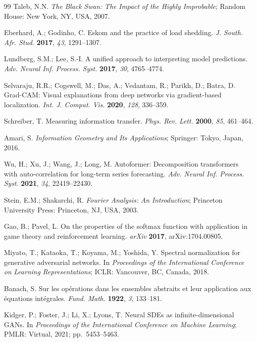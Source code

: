 \documentclass[11pt,a4paper]{article}  %
\theoremstyle{plain}
\theoremstyle{definition}
\theoremstyle{remark}
\begin{document}
\begin{thebibliography}{99}
Taleb, N.N. \textit{The Black Swan: The Impact of the Highly
Improbable}; Random House: New York, NY, USA, 2007.

Eberhard, A.; Godinho, C. Eskom and the practice of load shedding.
\textit{J. South. Afr. Stud.} \textbf{2017}, \textit{43}, 1291--1307.

Lundberg, S.M.; Lee, S.-I. A unified approach to interpreting model
predictions. \textit{Adv. Neural Inf. Process. Syst.} \textbf{2017},
\textit{30}, 4765--4774.

Selvaraju, R.R.; Cogswell, M.; Das, A.; Vedantam, R.; Parikh, D.;
Batra, D. Grad-CAM: Visual explanations from deep networks via
gradient-based localization. \textit{Int. J. Comput. Vis.}
\textbf{2020}, \textit{128}, 336--359.

Schreiber, T. Measuring information transfer. \textit{Phys. Rev. Lett.}
\textbf{2000}, \textit{85}, 461--464.

Amari, S. \textit{Information Geometry and Its Applications};
Springer: Tokyo, Japan, 2016.

Wu, H.; Xu, J.; Wang, J.; Long, M. Autoformer: Decomposition
transformers with auto-correlation for long-term series forecasting.
\textit{Adv. Neural Inf. Process. Syst.} \textbf{2021}, \textit{34},
22419--22430.

Stein, E.M.; Shakarchi, R. \textit{Fourier Analysis: An Introduction};
Princeton University Press: Princeton, NJ, USA, 2003.

Gao, B.; Pavel, L. On the properties of the softmax function with
application in game theory and reinforcement learning.
\textit{arXiv} \textbf{2017}, arXiv:1704.00805.

Miyato, T.; Kataoka, T.; Koyama, M.; Yoshida, Y. Spectral
normalization for generative adversarial networks.
In \textit{Proceedings of the International Conference on Learning
Representations}; ICLR: Vancouver, BC, Canada, 2018.

Banach, S. Sur les opérations dans les ensembles abstraits et leur
application aux équations intégrales. \textit{Fund. Math.}
\textbf{1922}, \textit{3}, 133--181.

Kidger, P.; Foster, J.; Li, X.; Lyons, T. Neural SDEs as infinite-dimensional
GANs. In \textit{Proceedings of the International Conference on Machine
Learning}; PMLR: Virtual, 2021; pp.~5453--5463.


\end{thebibliography}
\end{document}
